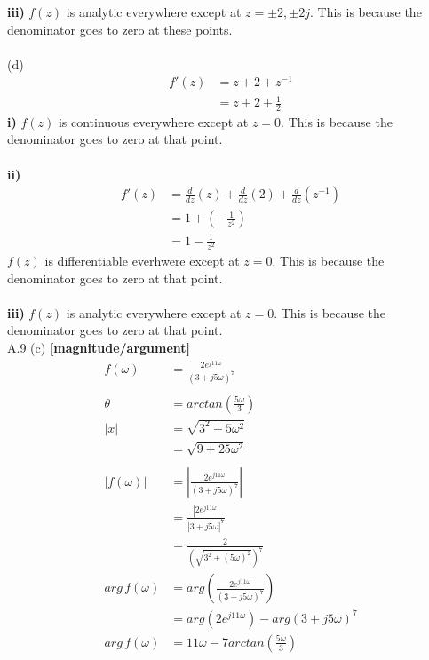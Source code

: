 \documentclass{article}
\begin{document}
{\bf iii)} $f(z)$ is analytic everywhere except at $z = \pm 2, \pm 2j$. This is because the denominator goes to zero at these points.\\\\

(d)
\begin{equation*}
\begin{split}
    f'(z) &= z + 2 + z^{-1}\\
    &= z + 2 + \frac{1}{2}
\end{split}
\end{equation*}
{\bf i)} $f(z)$ is continuous everywhere except at $z = 0$. This is because the denominator goes to zero at that point.\\\\

{\bf ii)} 
\begin{equation*}
\begin{split}
    f'(z) &= \frac{d}{dz}(z) + \frac{d}{dz}(2) + \frac{d}{dz}(z^{-1})\\
    &= 1 + (- \frac{1}{z^2})\\
    &= 1 - \frac{1}{z^2}
\end{split}
\end{equation*}
$f(z)$ is differentiable everhwere except at $z = 0$. This is because the denominator goes to zero at that point.\\\\

{\bf iii)} $f(z)$ is analytic everywhere except at $z = 0$. This is because the denominator goes to zero at that point.\\


\bigskip
A.9 (c) {\bf [magnitude/argument]}\\
\begin{equation*}
\begin{split}
    f(\omega) &= \frac{2e^{j11\omega}}{(3+j5\omega)^7}\\\\
    \theta &= arctan(\frac{5\omega}{3})\\
    |x| &= \sqrt{3^2 + 5\omega^2}\\
    &= \sqrt{9 + 25\omega^2}\\\\
    |f(\omega)| &= |\frac{2e^{j11\omega}}{(3+j5\omega)^7}|\\
    &= \frac{|2e^{j11\omega}|}{|3+j5\omega|^7}\\
    &= \frac{2}{(\sqrt{3^2 + (5\omega)^2})^7}\\
    arg\,f(\omega) &= arg(\frac{2e^{j11\omega}}{(3 + j5\omega)^7})\\
    &= arg(2e^{j11\omega}) - arg(3 + j5\omega)^7\\
    arg\,f(\omega) &= 11\omega - 7arctan(\frac{5\omega}{3})
\end{split}
\end{equation*}
\end{document}
